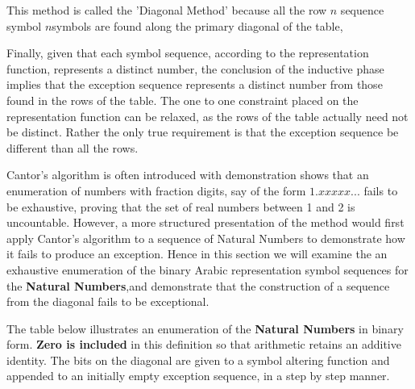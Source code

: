 \documentclass{article}
\begin{document}
	This method is called the 'Diagonal Method' because all the row \(n\) sequence symbol \(n\)symbols are found along the primary diagonal of the table, 
	
	Finally, given that each symbol sequence, according to the representation function, represents a distinct number, the conclusion of the inductive phase implies that the exception sequence represents a distinct number from those found in the rows of the table. The one to one constraint placed on the representation function can be relaxed, as the rows of the table actually need not be distinct. Rather the only true requirement is that the exception sequence be different than all the rows.
	
	Cantor's algorithm is often introduced with demonstration shows that an enumeration of numbers with fraction digits, say of the form \(1.xxxxx...\) fails to be exhaustive, proving that the set of real numbers between 1 and 2 is uncountable. However, a more structured presentation of the method would first apply Cantor’s algorithm to a sequence of Natural Numbers to demonstrate how it fails to produce an exception.  Hence in this section we will examine the an exhaustive enumeration of the binary Arabic representation symbol sequences for the \textbf{Natural Numbers},and demonstrate that the construction of a sequence from the diagonal fails to be exceptional.
	
	The table below illustrates an enumeration of the \textbf{Natural Numbers} in binary form. \textbf{Zero is included} in this definition so that arithmetic retains an additive identity. The bits on the diagonal are given to a symbol altering function and appended to an initially empty exception sequence, in a step by step manner. 
	
\end{document}
